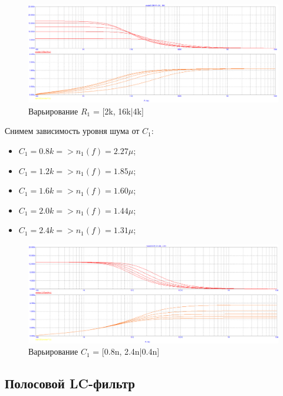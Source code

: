 \documentclass[a4paper, 12pt]{article}%
\begin{document}
\begin{enumerate}
\begin{figure}[h!]
    \centering
    \includegraphics[scale=0.3]{images/mod3_1_3.png}
    \caption{Варьирование $R_1$ = [2k, 16k|4k]}
    \label{fig:m313}
\end{figure}

Снимем зависимость уровня шума от $C_1$:
\begin{itemize}
    \item $C_1 = 0.8k => n_1(f) = 2.27\mu$;
    \item $C_1 = 1.2k => n_1(f) = 1.85\mu$;
    \item $C_1 = 1.6k => n_1(f) = 1.60\mu$;
    \item $C_1 = 2.0k => n_1(f) = 1.44\mu$;
    \item $C_1 = 2.4k => n_1(f) = 1.31\mu$;
\end{itemize}

\begin{figure}[h!]
    \centering
    \includegraphics[scale=0.3]{images/mod3_1_4.png}
    \caption{Варьирование $C_1$ = [0.8n, 2.4n|0.4n]}
    \label{fig:m314}
\end{figure}


\end{enumerate}

\subsection*{Полосовой LC-фильтр}
\end{document}

